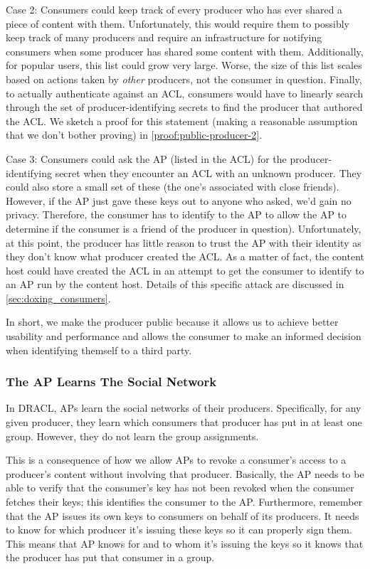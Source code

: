 \documentclass[pdftex,12pt,a4papaer,twoside,notitlepage]{report}
\begin{document}
Case 2: Consumers could keep track of every producer who has ever shared a piece
of content with them. Unfortunately, this would require them to possibly keep
track of many producers and require an infrastructure for notifying consumers
when some producer has shared some content with them. Additionally, for popular
users, this list could grow very large. Worse, the size of this list scales
based on actions taken by \emph{other} producers, not the consumer in question.
Finally, to actually authenticate against an ACL, consumers would have to
linearly search through the set of producer-identifying secrets to find the
producer that authored the ACL\@. We sketch a proof for this statement (making a
reasonable assumption that we don't bother proving) in
\cref{proof:public-producer-2}.

Case 3: Consumers could ask the AP (listed in the ACL) for the
producer-identifying secret when they encounter an ACL with an unknown producer.
They could also store a small set of these (the one's associated with close
friends). However, if the AP just gave these keys out to anyone who asked, we'd
gain no privacy. Therefore, the consumer has to identify to the AP to allow the
AP to determine if the consumer is a friend of the producer in question).
Unfortunately, at this point, the producer has little reason to trust the AP
with their identity as they don't know what producer created the ACL. As a
matter of fact, the content host could have created the ACL in an attempt to get
the consumer to identify to an AP run by the content host. Details of this
specific attack are discussed in \cref{sec:doxing_consumers}.

In short, we make the producer public because it allows us to achieve better
usability and performance and allows the consumer to make an informed decision
when identifying themself to a third party.

\subsubsection{The AP Learns The Social Network}
\label{sec:ap_learns_network}

In DRACL, APs learn the social networks of their producers. Specifically,
for any given producer, they learn which consumers that producer has put in at
least one group. However, they do not learn the group assignments.

This is a consequence of how we allow APs to revoke a consumer's access to a
producer's content without involving that producer. Basically, the AP needs to
be able to verify that the consumer's key has not been revoked when the consumer
fetches their keys; this identifies the consumer to the AP. Furthermore,
remember that the AP issues its own keys to consumers on behalf of its
producers. It needs to know for which producer it's issuing these keys so it can
properly sign them. This means that AP knows for and to whom it's issuing the
keys so it knows that the producer has put that consumer in a group.
\end{document}
